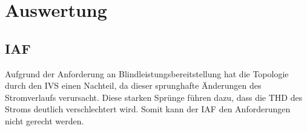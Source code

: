 \section{Auswertung}
\subsection{IAF}
Aufgrund der Anforderung an Blindleistungsbereitstellung hat die Topologie durch den \gls{IVS} einen Nachteil, da dieser sprunghafte Änderungen des Stromverlaufs verursacht. Diese starken Sprünge führen dazu, dass die \gls{THD} des Stroms deutlich verschlechtert wird. Somit kann der \gls{IAF} den Anforderungen nicht gerecht werden.